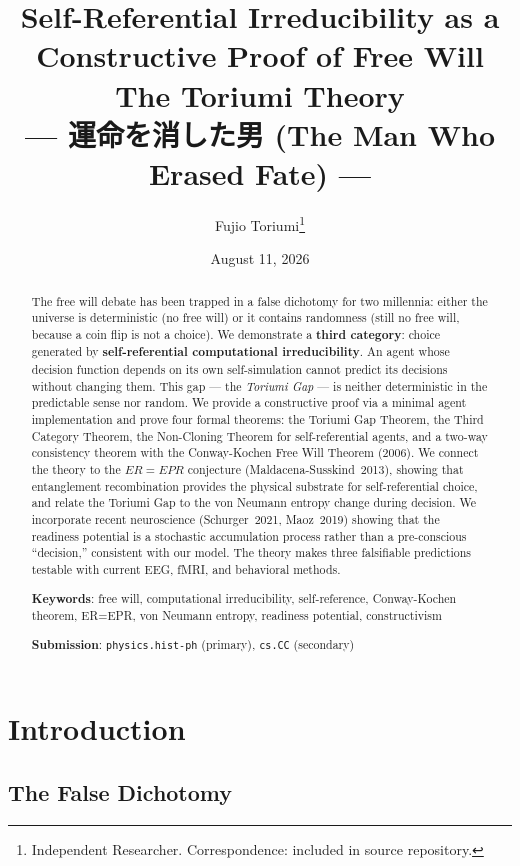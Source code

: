 \documentclass[12pt,a4paper]{article}
\title{\textbf{Self-Referential Irreducibility as a\\Constructive Proof of Free Will}\\[6pt]
\large The Toriumi Theory\\[4pt]
\large --- 運命を消した男 (The Man Who Erased Fate) ---}
\author{Fujio Toriumi\footnote{Independent Researcher. Correspondence: included in source repository.}}
\date{August 11, 2026}
\theoremstyle{definition}
\theoremstyle{remark}
\begin{document}
\maketitle

\begin{abstract}
The free will debate has been trapped in a false dichotomy for two millennia:
either the universe is deterministic (no free will) or it contains randomness
(still no free will, because a coin flip is not a choice). We demonstrate a
\textbf{third category}: choice generated by \textbf{self-referential
computational irreducibility}. An agent whose decision function depends on
its own self-simulation cannot predict its decisions without changing them.
This gap --- the \emph{Toriumi Gap} --- is neither deterministic in the
predictable sense nor random. We provide a constructive proof via a minimal
agent implementation and prove four formal theorems: the Toriumi Gap Theorem,
the Third Category Theorem, the Non-Cloning Theorem for self-referential agents,
and a two-way consistency theorem with the Conway-Kochen Free Will Theorem
(2006). We connect the theory to the $ER = EPR$ conjecture
(Maldacena-Susskind~2013), showing that entanglement recombination provides
the physical substrate for self-referential choice, and relate the Toriumi
Gap to the von Neumann entropy change during decision. We incorporate recent
neuroscience (Schurger~2021, Maoz~2019) showing that the readiness potential
is a stochastic accumulation process rather than a pre-conscious ``decision,''
consistent with our model. The theory makes three falsifiable predictions
testable with current EEG, fMRI, and behavioral methods.

\bigskip
\noindent\textbf{Keywords}: free will, computational irreducibility,
self-reference, Conway-Kochen theorem, ER=EPR, von Neumann entropy,
readiness potential, constructivism

\bigskip
\noindent\textbf{Submission}: \texttt{physics.hist-ph} (primary),
\texttt{cs.CC} (secondary)
\end{abstract}

\section{Introduction}

\subsection{The False Dichotomy}
\end{document}
